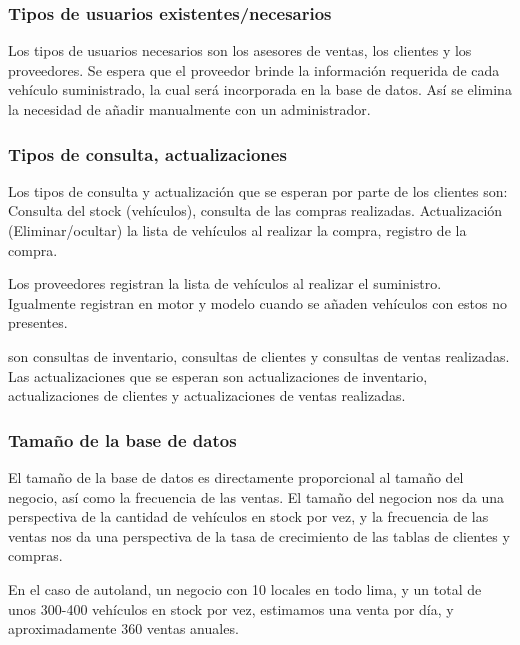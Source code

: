\documentclass[12pt]{article}
\begin{document}
\subsubsection{Tipos de usuarios existentes/necesarios}

Los tipos de usuarios necesarios son los asesores de ventas, los clientes y los proveedores. Se espera que el proveedor brinde la información requerida de cada vehículo suministrado, la cual será incorporada en la base de datos. Así se elimina la necesidad de añadir manualmente con un administrador.

\subsubsection{Tipos de consulta, actualizaciones}

Los tipos de consulta y actualización que se esperan por parte de los clientes son: Consulta del stock (vehículos),  consulta de las compras realizadas. Actualización (Eliminar/ocultar) la lista de vehículos al realizar la compra, registro de la compra.

Los proveedores registran la lista de vehículos al realizar el suministro. Igualmente registran en motor y modelo cuando se añaden vehículos con estos no presentes.

son consultas de inventario, consultas de clientes y consultas de ventas realizadas. Las actualizaciones que se esperan son actualizaciones de inventario, actualizaciones de clientes y actualizaciones de ventas realizadas.


\subsubsection{Tama\~no de la base de datos}

El tamaño de la base de datos es directamente proporcional al tamaño del negocio, así como la frecuencia de las ventas. El tamaño del negocion nos da una perspectiva de la cantidad de vehículos en stock por vez, y la frecuencia de las ventas nos da una perspectiva de la tasa de crecimiento de las tablas de clientes y compras.

En el caso de autoland, un negocio con 10 locales en todo lima, y un total de unos 300-400 vehículos en stock por vez, estimamos una venta por día, y aproximadamente 360 ventas anuales.

\newpage
\end{document}
